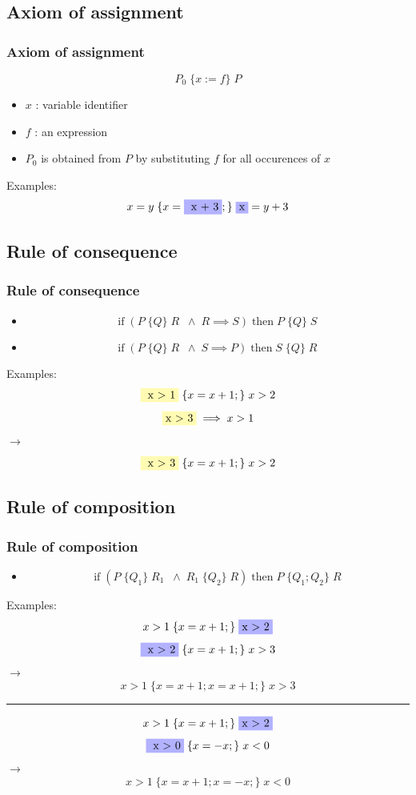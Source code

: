 \documentclass{beamer}
\begin{document}
\subsection{Axiom of assignment}
\begin{frame}
        \frametitle{Axiom of assignment}
	$$  P_{0} \; \{x := f \} \; P $$
\begin{itemize}
            \item  $x$ : variable identifier
            \item $f$ : an expression
\item $P_{0}$ is obtained from $P$ by substituting $f$ for all occurences of $x$
                \end {itemize}
\pause
Examples: 
		$$ x = y \; \{ x =\colorbox{blue!30}{ x + 3};\} \;\colorbox{blue!30} {x} = y + 3 $$
\end{frame}


\subsection{Rule of consequence}
\begin{frame}
        \frametitle{Rule of consequence}
	\begin{itemize}
		\item $$ \textrm{if} \; (P \; \{Q\} \; R \; \; \land \; R \implies S) \; \textrm{then} \; P \; \{Q\} \; S $$
		\item $$ \textrm{if} \; (P \; \{Q\} \; R \; \; \land \; S \implies P) \; \textrm{then} \; S \; \{Q\} \; R $$
	\end{itemize}
\pause
        Examples:
	$$\colorbox{yellow!30}{ x $>$ 1} \; \{ x = x + 1;\} \; x > 2 $$
	$$\colorbox{yellow!30} {x $>$ 3} \implies x > 1 $$
	$\rightarrow $ $$\colorbox{yellow!30}{ x $>$ 3} \; \{ x = x + 1;\} \; x > 2 $$
\end{frame}

\subsection{Rule of composition}
\begin{frame}
        \frametitle{Rule of composition}
	 \begin{itemize}
		 \item $$ \textrm{if} \; (P \; \{Q_{1}\} \; R_{1} \; \; \land \; R_{1} \; \{Q_{2}\} \; R) \; \textrm{then} \; P \; \{Q_{1};Q_{2}\} \; R $$
	 \end{itemize}
\pause
Examples: 
	$$ x > 1 \; \{ x = x + 1;\} \;\colorbox{blue!30} {x $>$ 2} $$
	$$\colorbox{blue!30}{ x $>$ 2} \; \{ x = x + 1;\} \; x > 3 $$
  $\rightarrow $ $$ x > 1 \; \{ x = x + 1; x = x + 1; \} \; x > 3 $$
	\pause
	\hrule
	$$ x > 1 \; \{ x = x + 1;\} \;\colorbox{blue!30} {x $>$ 2} $$
	$$\colorbox{blue!30}{ x $>$ 0} \; \{ x = -x;\} \; x < 0 $$
  $\rightarrow $ $$ x > 1 \; \{ x = x + 1; x = -x; \} \; x < 0 $$


\end{frame}
\end{document}
